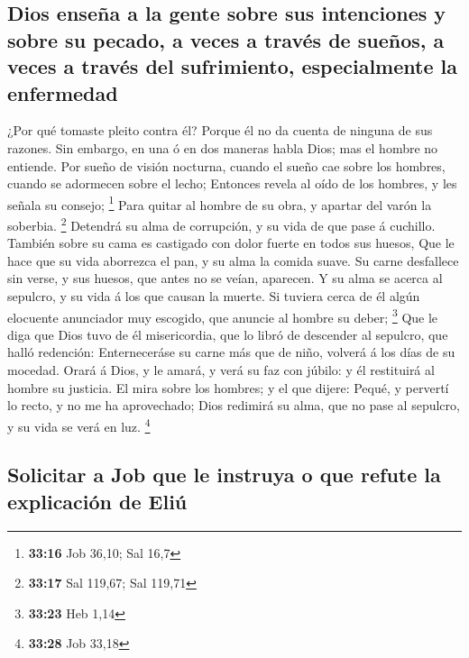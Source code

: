 \hypertarget{dios-enseuxf1a-a-la-gente-sobre-sus-intenciones-y-sobre-su-pecado-a-veces-a-travuxe9s-de-sueuxf1os-a-veces-a-travuxe9s-del-sufrimiento-especialmente-la-enfermedad}{%
\subsection{Dios enseña a la gente sobre sus intenciones y sobre su
pecado, a veces a través de sueños, a veces a través del sufrimiento,
especialmente la
enfermedad}\label{dios-enseuxf1a-a-la-gente-sobre-sus-intenciones-y-sobre-su-pecado-a-veces-a-travuxe9s-de-sueuxf1os-a-veces-a-travuxe9s-del-sufrimiento-especialmente-la-enfermedad}}

 ¿Por qué tomaste pleito contra él? Porque él no da
cuenta de ninguna de sus razones.  Sin embargo, en una ó
en dos maneras habla Dios; mas el hombre no entiende. 
Por sueño de visión nocturna, cuando el sueño cae sobre los hombres,
cuando se adormecen sobre el lecho;  Entonces revela al
oído de los hombres, y les señala su consejo; \footnote{\textbf{33:16}
  Job 36,10; Sal 16,7}  Para quitar al hombre de su obra,
y apartar del varón la soberbia. \footnote{\textbf{33:17} Sal 119,67;
  Sal 119,71}  Detendrá su alma de corrupción, y su vida
de que pase á cuchillo.  También sobre su cama es
castigado con dolor fuerte en todos sus huesos,  Que le
hace que su vida aborrezca el pan, y su alma la comida suave.
 Su carne desfallece sin verse, y sus huesos, que antes
no se veían, aparecen.  Y su alma se acerca al sepulcro,
y su vida á los que causan la muerte.  Si tuviera cerca
de él algún elocuente anunciador muy escogido, que anuncie al hombre su
deber; \footnote{\textbf{33:23} Heb 1,14}  Que le diga
que Dios tuvo de él misericordia, que lo libró de descender al sepulcro,
que halló redención:  Enterneceráse su carne más que de
niño, volverá á los días de su mocedad.  Orará á Dios, y
le amará, y verá su faz con júbilo: y él restituirá al hombre su
justicia.  El mira sobre los hombres; y el que dijere:
Pequé, y pervertí lo recto, y no me ha aprovechado;  Dios
redimirá su alma, que no pase al sepulcro, y su vida se verá en luz.
\footnote{\textbf{33:28} Job 33,18}

\hypertarget{solicitar-a-job-que-le-instruya-o-que-refute-la-explicaciuxf3n-de-eliuxfa}{%
\subsection{Solicitar a Job que le instruya o que refute la explicación
de
Eliú}\label{solicitar-a-job-que-le-instruya-o-que-refute-la-explicaciuxf3n-de-eliuxfa}}

